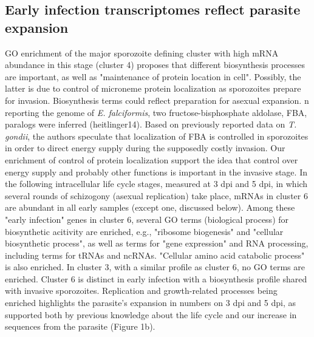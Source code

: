 \documentclass{bmcart}
\begin{document}
\subsection*{Early infection transcriptomes reflect parasite expansion}
GO enrichment of the major sporozoite defining cluster with high mRNA abundance in this stage (cluster 4) proposes that different biosynthesis processes are important, as well as "maintenance of protein location in cell". Possibly, the latter is due to control of microneme protein localization as sporozoites prepare for invasion. Biosynthesis terms could reflect preparation for asexual expansion. n reporting the genome of \textit{E. falciformis}, two fructose-bisphosphate aldolase, FBA, paralogs were inferred (heitlinger14). Based on previously reported data on \textit{T. gondii}, the authors speculate that localization of FBA is controlled in sporozoites in order to direct energy supply during the supposedly costly invasion. %
Our enrichment of control of protein localization support the idea that control over energy supply and probably other functions is important in the invasive stage.
In the following intracellular life cycle stages, measured at 3 dpi and 5 dpi, in which several rounds of schizogony (asexual replication) take place, mRNAs in cluster 6 are abundant in all early samples (except one, discussed below). Among these "early infection" genes in cluster 6, several GO terms (biological process) for biosynthetic acitivity are enriched, e.g., "ribosome biogenesis" and "cellular biosynthetic process", as well as terms for "gene expression" and RNA processing, including terms for tRNAs and ncRNAs. "Cellular amino acid catabolic process" is also enriched. In cluster 3, with a similar profile as cluster 6, no GO terms are enriched. Cluster 6 is distinct in early infection with a biosynthesis profile shared with invasive sporozoites. Replication and growth-related processes being enriched highlights the parasite's expansion in numbers on 3 dpi and 5 dpi, as supported both by previous knowledge about the life cycle and our increase in sequences from the parasite (Figure 1b). 
\end{document}
